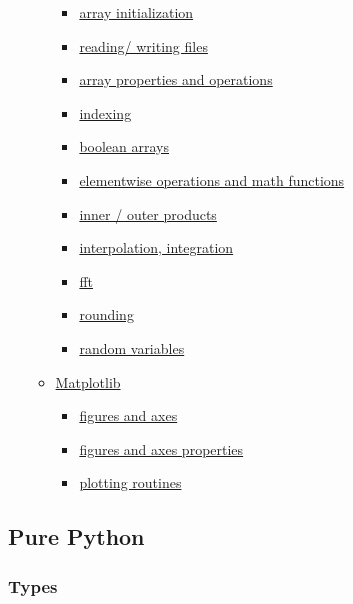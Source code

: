 \documentclass[10pt,a4paperpaper,twocolumn]{article}
\providecommand{\tightlist}{%
  \setlength{\itemsep}{0pt}\setlength{\parskip}{0pt}}
\begin{document}
\begin{itemize}
\begin{itemize}
    \begin{itemize}
    \tightlist
    \item
      \protect\hyperlink{array-initialization}{array initialization}
    \item
      \protect\hyperlink{reading-writing-files}{reading/ writing files}
    \item
      \protect\hyperlink{array-properties-and-operations}{array
      properties and operations}
    \item
      \protect\hyperlink{indexing}{indexing}
    \item
      \protect\hyperlink{boolean-arrays}{boolean arrays}
    \item
      \protect\hyperlink{elementwise-operations-and-math-functions}{elementwise
      operations and math functions}
    \item
      \protect\hyperlink{inner--outer-products}{inner / outer products}
    \item
      \protect\hyperlink{interpolation-integration}{interpolation,
      integration}
    \item
      \protect\hyperlink{fft}{fft}
    \item
      \protect\hyperlink{rounding}{rounding}
    \item
      \protect\hyperlink{random-variables}{random variables}
    \end{itemize}
  \item
    \protect\hyperlink{matplotlib}{Matplotlib}

    \begin{itemize}
    \tightlist
    \item
      \protect\hyperlink{figures-and-axes}{figures and axes}
    \item
      \protect\hyperlink{figures-and-axes-properties}{figures and axes
      properties}
    \item
      \protect\hyperlink{plotting-routines}{plotting routines}
    \end{itemize}
  \end{itemize}
\end{itemize}

\hypertarget{pure-python}{\subsection{Pure Python}\label{pure-python}}

\hypertarget{types}{\subsubsection{Types}\label{types}}
\end{document}
